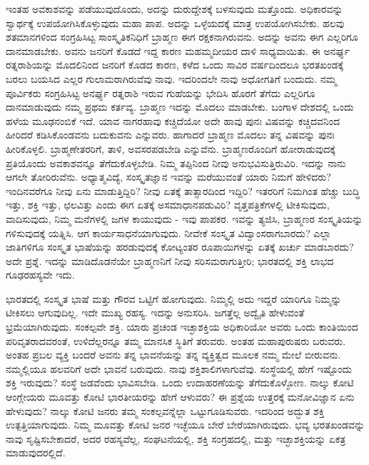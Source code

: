 ಇಂತಹ ಅವಕಾಶವನ್ನು ಪಡೆಯುವುದೊಂದು, ಅದನ್ನು ದುರುದ್ದೇಶಕ್ಕೆ ಬಳಸುವುದು ಮತ್ತೊಂದು. ಅಧಿಕಾರವನ್ನು ಸ್ವಾರ್ಥಕ್ಕೆ ಉಪಯೋಗಿಸಿಕೊಳ್ಳುವುದು ಮಹಾ ಪಾಪ. ಅದನ್ನು ಒಳ್ಳೆಯದಕ್ಕೆ ಮಾತ್ರ ಉಪಯೋಗಿಸಬೇಕು. ಹಲವು ಶತಮಾನಗಳಿಂದ ಸಂಗ್ರಹಿಸಿಟ್ಟ ಸಾಂಸ್ಕೃತಿಕನಿಧಿಗೆ ಬ್ರಾಹ್ಮಣ ಈಗ ರಕ್ಷಕನಾಗಿರುವನು. ಅದನ್ನು ಅವನು ಈಗ ಎಲ್ಲರಿಗೂ ದಾನಮಾಡಬೇಕು. ಅವನು ಜನರಿಗೆ ಕೊಡದೆ ಇದ್ದ ಕಾರಣ ಮಹಮ್ಮದೀಯರ ದಾಳಿ ಸಾಧ್ಯವಾಯಿತು. ಈ ಅನರ್ಘ್ಯ ರತ್ನರಾಶಿಯನ್ನು ಮೊದಲಿನಿಂದ ಜನರಿಗೆ ಕೊಡದ ಕಾರಣ, ಕಳೆದ ಒಂದು ಸಾವಿರ ವರ್ಷದಿಂದಲೂ ಭರತಖಂಡಕ್ಕೆ ಬರಲು ಬಯಸಿದ ಎಲ್ಲರ ಗುಲಾಮರಾಗಿರುವೆವು ನಾವು. ಇದರಿಂದಲೇ ನಾವು ಅಧೋಗತಿಗೆ ಬಂದುದು. ನಮ್ಮ ಪೂರ್ವಿಕರು ಸಂಗ್ರಹಿಸಿಟ್ಟ ಅನರ್ಘ್ಯ ರತ್ನರಾಶಿ ಇರುವ ಗುಹೆಯನ್ನು ಭೇದಿಸಿ ಹೊರಗೆ ತೆಗೆದು ಎಲ್ಲರಿಗೂ ದಾನಮಾಡುವುದು ನಮ್ಮ ಪ್ರಥಮ ಕರ್ತವ್ಯ. ಬ್ರಾಹ್ಮಣ ಇದನ್ನು ಮೊದಲು ಮಾಡಬೇಕು. ಬಂಗಾಳ ದೇಶದಲ್ಲಿ ಒಂದು ಹಳೆಯ ಮೂಢನಂಬಿಕೆ ಇದೆ. ಯಾವ ನಾಗರಹಾವು ಕಚ್ಚಿದೆಯೋ ಅದೇ ಹಾವು ಪುನಃ ವಿಷವನ್ನು ಕಚ್ಚಿದವನಿಂದ ಹೀರಿದರೆ ಕಡಿಸಿಕೊಂಡವನು ಬದುಕುವನು ಎನ್ನುವರು. ಹಾಗಾದರೆ ಬ್ರಾಹ್ಮಣ ಮೊದಲು ತನ್ನ ವಿಷವನ್ನು ಪುನಃ ಹೀರಿಕೊಳ್ಳಲಿ. ಬ್ರಾಹ್ಮಣೇತರರಿಗೆ, ತಾಳಿ, ಅವಸರಪಡಬೇಡಿ ಎನ್ನುವೆನು. ಬ್ರಾಹ್ಮಣರೊಂದಿಗೆ ಹೋರಾಡುವುದಕ್ಕೆ ಪ್ರತಿಯೊಂದು ಅವಕಾಶವನ್ನೂ ತೆಗೆದುಕೊಳ್ಳಬೇಡಿ. ನಿಮ್ಮ ತಪ್ಪಿನಿಂದ ನೀವು ಅನುಭವಿಸುತ್ತಿರುವಿರಿ. ಇದನ್ನು ನಾನು ಆಗಲೇ ತೋರಿರುವೆನು. ಅಧ್ಯಾತ್ಮವಿದ್ಯೆ, ಸಂಸ್ಕೃತಜ್ಞಾನ ಇವನ್ನು ಮರೆಯುವಂತೆ ಯಾರು ನಿಮಗೆ ಹೇಳಿದರು? ಇಂದಿನವರೆಗೂ ನೀವು ಏನು ಮಾಡುತ್ತಿದ್ದಿರಿ? ನೀವು ಏತಕ್ಕೆ ತಾತ್ಸಾರದಿಂದ ಇದ್ದಿರಿ? ಇತರರಿಗೆ ನಿಮಗಿಂತ ಹೆಚ್ಚು ಬುದ್ಧಿ ಇತ್ತು, ಶಕ್ತಿ ಇತ್ತು, ಛಲವಿತ್ತು ಎಂದು ಈಗ ಏತಕ್ಕೆ ಅಸಮಾಧಾನಪಡುವಿರಿ? ವೃತ್ತಪತ್ರಿಕೆಗಳಲ್ಲಿ ಟೀಕಿಸುವುದು, ವಾದಿಸುವುದು, ನಿಮ್ಮ ಮನೆಗಳಲ್ಲಿ ಜಗಳ ಕಾಯುವುದು - ಇವು ಪಾಪಕರ. ಇವನ್ನು ತ್ಯಜಿಸಿ, ಬ್ರಾಹ್ಮಣರ ಸಂಸ್ಕೃತಿಯನ್ನು ಗಳಿಸುವುದಕ್ಕೆ ಯತ್ನಿಸಿ. ಆಗ ಕಾರ್ಯಸಾಧನೆಯಾಗುವುದು. ನೀವೇಕೆ ಸಂಸ್ಕೃತ ವಿದ್ವಾಂಸರಾಗಬಾರದು? ಎಲ್ಲಾ ಜಾತಿಗಳಿಗೂ ಸಂಸ್ಕೃತ ಭಾಷೆಯನ್ನು ಹರಡುವುದಕ್ಕೆ ಕೋಟ್ಯಂತರ ರೂಪಾಯಿಗಳನ್ನು ಏತಕ್ಕೆ ಖರ್ಚು ಮಾಡಬಾರದು? ಅದೇ ಪ್ರಶ್ನೆ. ಇದನ್ನು ಮಾಡಿದೊಡನೆಯೇ ಬ್ರಾಹ್ಮಣನಿಗೆ ನೀವು ಸರಿಸಮರಾಗುತ್ತೀರಿ; ಭಾರತದಲ್ಲಿ ಶಕ್ತಿ ಲಾಭದ ಗೂಢರಹಸ್ಯವೇ ಇದು.

\vskip 4pt

ಭಾರತದಲ್ಲಿ ಸಂಸ್ಕೃತ ಭಾಷೆ ಮತ್ತು ಗೌರವ ಒಟ್ಟಿಗೆ ಹೋಗುವುದು. ನಿಮ್ಮಲ್ಲಿ ಅದು ಇದ್ದರೆ ಯಾರಿಗೂ ನಿಮ್ಮನ್ನು ಟೀಕಿಸಲು ಆಗುವುದಿಲ್ಲ. ಇದೇ ಮುಖ್ಯ ರಹಸ್ಯ. ಇದನ್ನು ಅನುಸರಿಸಿ. ಜಗತ್ತೆಲ್ಲ ಅದ್ವೈತಿ ಹೇಳುವಂತೆ ಭ್ರಮೆಯಾಗಿರುವುದು. ಸಂಕಲ್ಪವೇ ಶಕ್ತಿ. ಯಾರು ಪ್ರಚಂಡ ಇಚ್ಛಾಶಕ್ತಿಯ ಅಧಿಕಾರಿಯೋ ಅವರು ಒಂದು ಕಾಂತಿಯಿಂದ ಪರಿವೃತರಾದವರಂತೆ, ಉಳಿದೆಲ್ಲರನ್ನೂ ತಮ್ಮ ಮಾನಸಿಕ ಸ್ಥಿತಿಗೆ ತರುವರು. ಅಂತಹ ಮಹಾಪುರುಷರು ಬರುವರು. ಅಂತಹ ಪ್ರಬಲ ವ್ಯಕ್ತಿ ಬಂದರೆ ಅವನು ತನ್ನ ಭಾವನೆಯನ್ನು ತನ್ನ ವ್ಯಕ್ತಿತ್ವದ ಮೂಲಕ ನಮ್ಮ ಮೇಲೆ ಬೀರುವನು. ನಮ್ಮಲ್ಲಿಯೂ ಹಲವರಿಗೆ ಅದೇ ಭಾವನೆ ಬರುವುದು. ನಾವು ಶಕ್ತಿಶಾಲಿಗಳಾಗುವೆವು. ಸಂಸ್ಥೆಯಲ್ಲಿ ಹೇಗೆ ಇಷ್ಟೊಂದು ಶಕ್ತಿ ಇರುವುದು? ಸಂಸ್ಥೆ ಜಡವೆಂದು ಭಾವಿಸಬೇಡಿ. ಒಂದು ಉದಾಹರಣೆಯನ್ನು ತೆಗೆದುಕೊಳ್ಳೋಣ. ನಾಲ್ಕು ಕೋಟಿ ಆಂಗ್ಲೇಯರು ಮೂವತ್ತು ಕೋಟಿ ಭಾರತೀಯರನ್ನು ಹೇಗೆ ಆಳುವರು? ಈ ಪ್ರಶ್ನೆಯ ಉತ್ತರಕ್ಕೆ ಮನೋವಿಜ್ಞಾನ ಏನು ಹೇಳುವುದು? ನಾಲ್ಕು ಕೋಟಿ ಜನರು ತಮ್ಮ ಸಂಕಲ್ಪವನ್ನೆಲ್ಲಾ ಒಟ್ಟುಗೂಡಿಸುವರು. ಇದರಿಂದ ಅದ್ಭುತ ಶಕ್ತಿ ಉತ್ಪತ್ತಿಯಾಗುವುದು. ನಿಮ್ಮ ಮೂವತ್ತು ಕೋಟಿ ಜನರ ಇಚ್ಛೆಯೂ ಬೇರೆ ಬೇರೆಯಾಗಿರುವುದು. ಭವ್ಯ ಭರತಖಂಡವನ್ನು ನಾವು ಸೃಷ್ಟಿಸಬೇಕಾದರೆ, ಅದರ ರಹಸ್ಯವೆಲ್ಲ, ಸಂಘಟನೆಯಲ್ಲಿ, ಶಕ್ತಿ ಸಂಗ್ರಹದಲ್ಲಿ, ಮತ್ತು ಇಚ್ಛಾಶಕ್ತಿಯನ್ನು ಏಕತ್ರ ಮಾಡುವುದರಲ್ಲಿದೆ.

